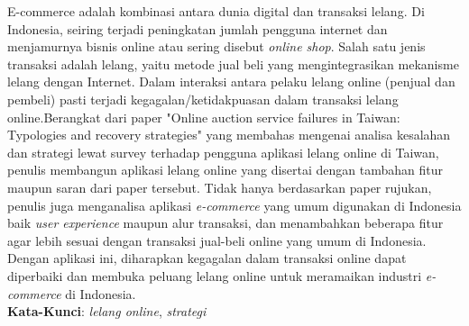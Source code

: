 \begin{abstrak}
		E-commerce adalah kombinasi antara dunia digital dan transaksi lelang. Di Indonesia, seiring terjadi peningkatan jumlah pengguna internet dan menjamurnya bisnis online atau sering disebut \textit{online shop}. Salah satu jenis transaksi adalah lelang, yaitu metode jual beli yang mengintegrasikan mekanisme lelang dengan Internet.
	    \newline
	    \indent Dalam interaksi antara pelaku lelang online (penjual dan pembeli) pasti terjadi kegagalan/ketidakpuasan dalam transaksi lelang online.Berangkat dari paper "Online auction service failures in   {Taiwan}: {Typologies} and recovery strategies" yang membahas mengenai analisa kesalahan dan strategi lewat survey terhadap pengguna aplikasi lelang online di Taiwan, penulis membangun aplikasi lelang online yang disertai dengan tambahan fitur maupun saran dari paper tersebut.
	    \newline 
	    \indent Tidak hanya berdasarkan paper rujukan, penulis juga menganalisa aplikasi \textit{e-commerce} yang umum digunakan di Indonesia baik \textit{user experience} maupun alur transaksi, dan menambahkan beberapa fitur agar lebih sesuai dengan transaksi jual-beli online yang umum di Indonesia. Dengan aplikasi ini, diharapkan kegagalan dalam transaksi online dapat diperbaiki dan membuka peluang lelang online untuk meramaikan industri \textit{e-commerce} di Indonesia.\\
\noindent \textbf{Kata-Kunci}: \textit{lelang online}, \textit{strategi }
\end{abstrak}